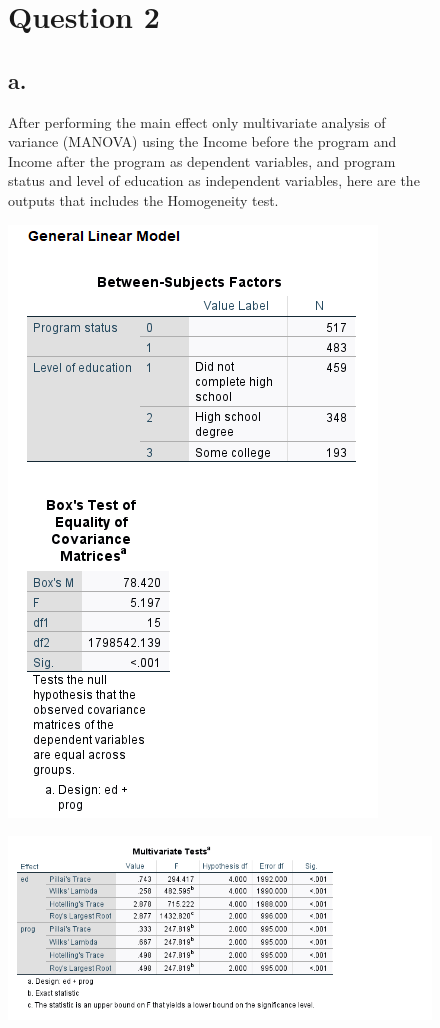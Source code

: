 \documentclass[english,10pt,a4paper]{article}
\begin{document}
	\begin{figure}[h]	
	\section*{Question 2}
	
	\subsection*{a.} After performing the main effect only multivariate analysis of variance (MANOVA) using the Income
	before the program and Income after the program as dependent variables, and program status
	and level of education as independent variables, here are the outputs that includes the Homogeneity test. 
	\end{figure}
	
	\begin{figure}[h]
		
		\includegraphics[width=0.5\linewidth]{Box's test} \newline
	
	\end{figure}
	
	\begin{figure}[h]
		
	
		\includegraphics[width=1\linewidth]{Multivariate test}
	\end{figure}
	
\end{document}
